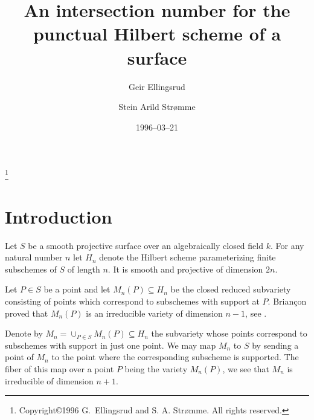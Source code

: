 \documentclass[12pt]{amsart}
\def\Hn{H_n}
\def\sub{\subseteq}
\theoremstyle{definition}
\theoremstyle{remark}
\numberwithin{equation}{section}
\begin{document}


\title [Intersection number for punctual Hilbert sceheme]
{An intersection number for the \\ punctual Hilbert scheme of a
  surface}%

\author{Geir Ellingsrud}
    \address{Mathematical Institute\\
       University of Oslo\\
       P.~O.~Box~1053\\
       N--0316 Oslo, Norway}
\author{Stein Arild Str{\o}mme}
     \address{Mathematical Institute\\
       University of Bergen\\
       All\'eg 55\\
       N--5007 Bergen, Norway}

\thanks{Copyright\copyright 1996
G.~Ellingsrud and S. A. Str{\o}mme.  All rights reserved.}

\date{1996--03--21}



\maketitle


\section{Introduction}

Let $S$ be a smooth projective surface over an algebraically closed
field $k$. For any natural number $n$ let $\Hn$ denote the Hilbert
scheme parameterizing finite subschemes of $S$ of length $n$. It is
smooth and projective of dimension $2n$.

Let $P\in S$ be a point and let $M_n(P)\sub \Hn$ be the closed
reduced subvariety consisting of points which correspond to subschemes
with support at $P$. Brian\c con proved that $M_n(P)$ is an irreducible
variety of dimension $n-1$, see \cite{Bria}.

Denote by $M_n=\cup_{P\in S}M_n(P)\sub \Hn$ the subvariety whose
points correspond to subschemes with support in just one point. We may
map $M_n$ to $S$ by sending a point of $M_n$ to the point where the
corresponding subscheme is supported. The fiber of this map over a
point $P$ being the variety $M_n(P)$, we see that $M_n$ is irreducible
of dimension $n+1$.
\end{document}
